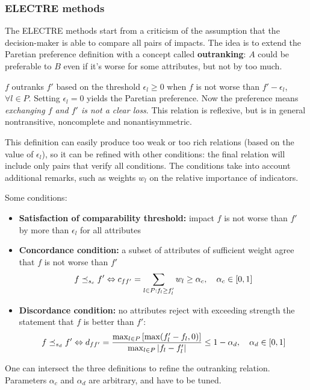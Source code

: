 \subsubsection{ELECTRE methods}

The ELECTRE methods start from a criticism of the assumption that the decision-maker is able to compare all pairs of impacts. The idea is to extend the Paretian preference definition with a concept called \textbf{outranking}: $A$ could be preferable to $B$ even if it's worse for some attributes, but not by too much.

$f$ outranks $f'$ based on the threshold $\epsilon_l \geq 0$ when $f$ is not worse than $f' - \epsilon_l$, $\forall l \in P$. Setting $\epsilon_l = 0$ yields the Paretian preference. Now the preference means \textit{exchanging $f$ and $f'$ is not a clear loss}. This relation is reflexive, but is in general nontransitive, noncomplete and nonantisymmetric.

This definition can easily produce too weak or too rich relations (based on the value of $\epsilon_l$), so it can be refined with other conditions: the final relation will include only pairs that verify all conditions. The conditions take into account additional remarks, such as weights $w_l$ on the relative importance of indicators.

Some conditions: 
\begin{itemize}
	\item \textbf{Satisfaction of comparability threshold:} impact $f$ is not worse than $f'$ by more than $\epsilon_l$ for all attributes
	
	\item \textbf{Concordance condition:} a subset of attributes of sufficient weight agree that $f$ is not worse than $f'$
	$$ f \preceq_{s_c} f' \Leftrightarrow c_{ff'} = \sum_{l \in P: f_l \geq f_l'} w_l \geq \alpha_c, \quad \alpha_c \in [0,1] $$
	
	\item \textbf{Discordance condition:} no attributes reject with exceeding strength the statement that $f$ is better than $f'$:
	$$ f \preceq_{s_d} f' \Leftrightarrow d_{ff'} = \frac{\max_{l \in P} \left[\max (f_l' - f_l, 0)\right]}{\max_{l \in P} |f_l - f_l'|} \leq 1 - \alpha_d, \quad \alpha_d \in [0,1] $$
\end{itemize}
One can intersect the three definitions to refine the outranking relation. Parameters $\alpha_c$  and $\alpha_d$ are arbitrary, and have to be tuned.

